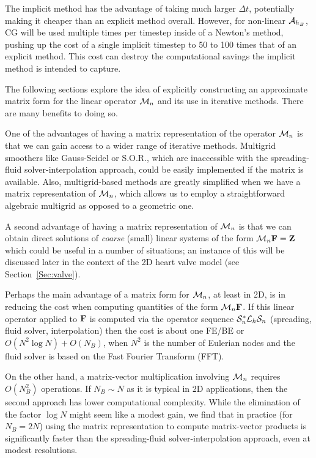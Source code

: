 The implicit method has the advantage of taking much larger $\Delta t$, potentially making it cheaper than an explicit method overall. However, for non-linear $\mathcal{A}_{h_B}$, CG will be used multiple times per timestep inside of a Newton's method, pushing up the cost of a single implicit timestep to 50 to 100 times that of an explicit method. This cost can destroy the computational savings the implicit method is intended to capture.

The following sections explore the idea of explicitly constructing an approximate matrix form for the linear operator $\mathcal{M}_n$ and its use in iterative methods. There are many benefits to doing so. 

One of the advantages of having a matrix representation of the operator $\mathcal{M}_n$ is that we can gain access to  a wider range of iterative methods.  Multigrid smoothers like Gauss-Seidel or S.O.R., which are inaccessible with the spreading-fluid solver-interpolation approach, could be easily implemented if the matrix  is available.
Also, multigrid-based methods are greatly simplified when we have a matrix representation of $\mathcal{M}_n$, which allows us to employ a straightforward algebraic multigrid as opposed to a geometric one.
 
A second advantage of having a matrix representation of $\mathcal{M}_n$ is that we can obtain direct solutions of {\em coarse} (small) linear systems of the form $\mathcal{M}_n\mathbf{F}=\mathbf{Z}$ which could be useful in a number of situations; an instance of this will be discussed later in the context of the 2D heart valve model (see Section~\ref{Sec:valve}).

Perhaps the main advantage of a matrix form for $\mathcal{M}_n$, at least in 2D, is in reducing the cost when computing quantities of the form  $\mathcal{M}_n\mathbf{F}$.  If this linear operator applied to $\mathbf{F}$ is computed via the operator sequence $\mathcal{S}^*_n \mathcal{L}_h \mathcal{S}_n$ (spreading, fluid solver, interpolation) then the cost is about one FE/BE or $O(N^2\log N) + O(N_B)$, when $N^2$ is the number of Eulerian nodes and the fluid solver is based on the Fast Fourier Transform (FFT).  

On the other hand, a matrix-vector multiplication involving $\mathcal{M}_n$ requires $O(N_B^2)$ operations.  If  $N_B \sim N$ as it is typical in 2D applications, then the second approach has lower computational complexity. While
 the elimination of the factor $\log N$ might seem like a modest gain, we find that in practice (for $N_B=2N$) using the 
 matrix representation to compute matrix-vector products is significantly faster  than the spreading-fluid solver-interpolation approach, even at modest resolutions.

